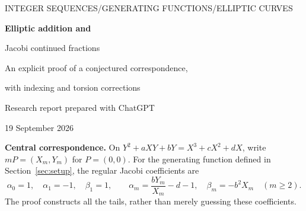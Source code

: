 \documentclass[11pt,letterpaper]{article}
\numberwithin{equation}{section}
\theoremstyle{definition}
\theoremstyle{remark}
\begin{document}
\begin{center}
{\small\sffamily\color{accent}INTEGER SEQUENCES\quad /\quad GENERATING FUNCTIONS\quad /\quad ELLIPTIC CURVES}\par
\vspace{15pt}
{\LARGE\bfseries\color{ink}Elliptic addition and\par Jacobi continued fractions}\par
\vspace{9pt}
{\large An explicit proof of a conjectured correspondence,\par with indexing and torsion corrections}\par
\vspace{13pt}
{\normalsize Research report prepared with ChatGPT}\par
{\small 19 September 2026}
\end{center}
\vspace{8pt}
\begin{abstract}
Paul Barry's 2023 paper \emph{Integer sequences from elliptic curves}
conjectures that the Jacobi continued-fraction coefficients of a particular
algebraic generating function are given by coordinates of successive
multiples of a point on an elliptic curve. We give an explicit algebraic proof
of a consistently indexed, non-torsion formulation of that assertion.
The main construction is a closed expression for every normalized complete
quotient. A factorization shows that deleting one continued-fraction layer
is exactly translation by the distinguished elliptic-curve point, after a
rational change of coordinates. No inference from finitely many coefficients
is used in the proof.

The corresponding formulas for both coordinates in terms of Hankel and
modified Hankel determinants follow from a self-contained moment argument.
We also derive the associated Somos-4 recurrence and recover the
already-known division-polynomial identity, explicitly crediting the
2026 proof of Liu, Wang, and Zhang. Torsion specializations explain an essential
missing hypothesis: a zero Hankel determinant need not cause all later ones
to vanish. In fact, the generating function is nonrational whenever the
parameter $b$ is nonzero, even in these exceptional cases. Exact computations
on 106 nonsingular curves, sixteen symbolic identities, and four worked
examples accompany the article. The literature audit identifies the precise
conjecture addressed and distinguishes the present proof from previously
established results; priority is not asserted.
\end{abstract}
\vspace{3pt}
\begin{resultbox}
\textbf{Central correspondence.} On
$Y^2+aXY+bY=X^3+cX^2+dX$, write $mP=(X_m,Y_m)$ for $P=(0,0)$.
For the generating function defined in Section~\ref{sec:setup}, the regular
Jacobi coefficients are
\[
 \alpha_0=1,\quad\alpha_1=-1,\quad\beta_1=1,\qquad
 \alpha_m=\frac{bY_m}{X_m}-d-1,\quad
 \beta_m=-b^2X_m\quad(m\ge2).
\]
The proof constructs all the tails, rather than merely guessing these coefficients.
\end{resultbox}
\clearpage
{\small\setlength{\parskip}{0pt}\tableofcontents}
\clearpage
\end{document}
